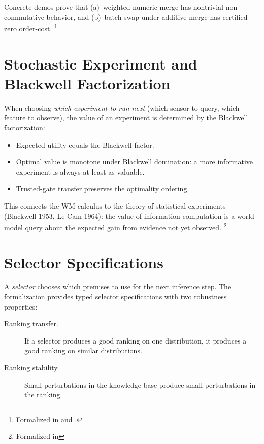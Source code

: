 \documentclass[11pt,openany]{report}
\begin{document}
\noindent
Concrete demos prove that (a)~weighted numeric merge has nontrivial
non-commutative behavior, and (b)~batch swap under additive merge
has certified zero order-cost.%
\footnote{Formalized in
 and
.}


\section{Stochastic Experiment and Blackwell Factorization}

When choosing \emph{which experiment to run next} (which sensor to
query, which feature to observe), the value of an experiment is
determined by the Blackwell factorization:

\begin{itemize}
\item Expected utility equals the Blackwell factor.
\item Optimal value is monotone under Blackwell domination: a more
  informative experiment is always at least as valuable.
\item Trusted-gate transfer preserves the optimality ordering.
\end{itemize}

\noindent
This connects the WM calculus to the theory of statistical
experiments (Blackwell 1953, Le Cam 1964): the value-of-information
computation is a world-model query about the expected gain from
evidence not yet observed.%
\footnote{Formalized in
}



\section{Selector Specifications}
\label{sec:selectors}

A \emph{selector} chooses which premises to use for the next
inference step.  The formalization provides typed selector
specifications with two robustness properties:

\begin{description}
\item[Ranking transfer.] If a selector produces a good ranking on
  one distribution, it produces a good ranking on similar
  distributions.
\item[Ranking stability.] Small perturbations in the knowledge base
  produce small perturbations in the ranking.
\end{description}
\end{document}
